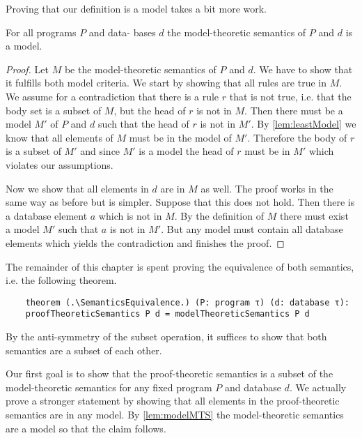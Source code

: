 Proving that our definition is a model takes a bit more work.

\begin{lemma}[\modelTheoreticSemanticsIsModel]\label{lem:modelMTS}
    For all programs $P$ and data- bases $d$ the model-theoretic semantics of $P$ and $d$ is a model.
\end{lemma}
\begin{proof}
    Let $M$ be the model-theoretic semantics of $P$ and $d$. We have to show that it fulfills both model criteria.
    We start by showing that all rules are true in $M$. We assume for a contradiction that there is a rule $r$ that is not true, i.e. that the body set is a subset of $M$, but the head of $r$ is not in $M$. Then there must be a model $M'$ of $P$ and $d$ such that the head of $r$ is not in $M'$. By \cref{lem:leastModel} we know that all elements of $M$ must be in the model of $M'$. Therefore the body of $r$ is a subset of $M'$ and since $M'$ is a model the head of $r$ must be in $M'$ which violates our assumptions.

    Now we show that all elements in $d$ are in $M$ as well. The proof works in the same way as before but is simpler. Suppose that this does not hold. Then there is a database element $a$ which is not in $M$. By the definition of $M$ there must exist a model $M'$ such that $a$ is not in $M'$. But any model must contain all database elements which yields the contradiction and finishes the proof.
\end{proof}

The remainder of this chapter is spent proving the equivalence of both semantics, i.e. the following theorem.

\begin{lstlisting}
    theorem (.\SemanticsEquivalence.) (P: program τ) (d: database τ): 
    proofTheoreticSemantics P d = modelTheoreticSemantics P d
\end{lstlisting}

By the anti-symmetry of the subset operation, it suffices to show that both semantics are a subset of each other.

Our first goal is to show that the proof-theoretic semantics is a subset of the model-theoretic semantics for any fixed program $P$ and database $d$. We actually prove a stronger statement by showing that all elements in the proof-theoretic semantics are in any model. By \cref{lem:modelMTS} the model-theoretic semantics are a model so that the claim follows.

